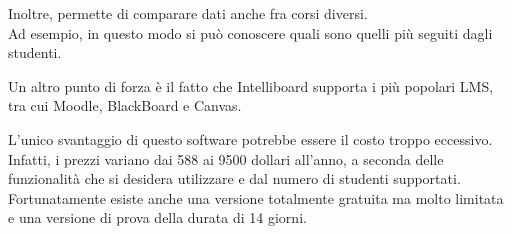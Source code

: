 Inoltre, permette di comparare dati anche fra corsi diversi. \\ Ad esempio, in questo modo si può conoscere quali sono quelli più seguiti dagli studenti.

Un altro punto di forza è il fatto che Intelliboard supporta i più popolari LMS, tra cui Moodle, BlackBoard e Canvas.

L'unico svantaggio di questo software potrebbe essere il costo troppo eccessivo. \\ Infatti, i prezzi variano dai 588 ai 9500 dollari all’anno, a seconda delle funzionalità che si desidera utilizzare e dal numero di studenti supportati. \\ Fortunatamente esiste anche una versione totalmente gratuita ma molto limitata e una versione di prova della durata di 14 giorni.

\cite{Intelliboard}